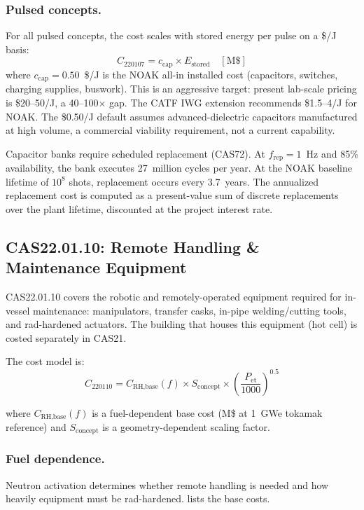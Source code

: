 \documentclass{article}
\begin{document}
\subsubsection{Pulsed concepts.}
For all pulsed concepts, the cost scales with stored energy per
pulse on a \$/J basis:
\begin{equation}
  C_{220107} = c_{\text{cap}} \times E_{\text{stored}} \quad [\text{M\$}]
\end{equation}
where $c_{\text{cap}} = 0.50$~\$/J is the NOAK all-in installed cost
(capacitors, switches, charging supplies, buswork).  This is an
aggressive target: present lab-scale pricing is \$20--50/J, a 40--100$\times$
gap.  The CATF IWG extension \citep{woodruff2026b} recommends
\$1.5--4/J for NOAK.  The \$0.50/J default assumes advanced-dielectric
capacitors manufactured at high volume, a commercial viability
requirement, not a current capability.

Capacitor banks require scheduled replacement (CAS72).  At $f_{\text{rep}}
= 1$~Hz and 85\% availability, the bank executes 27~million cycles per
year.  At the NOAK baseline lifetime of $10^8$ shots, replacement occurs
every 3.7~years.  The annualized replacement cost is computed as a
present-value sum of discrete replacements over the plant lifetime,
discounted at the project interest rate.

\subsection{CAS22.01.10: Remote Handling \& Maintenance Equipment}
\label{sec:cas2210}

CAS22.01.10 covers the robotic and remotely-operated equipment required
for in-vessel maintenance: manipulators, transfer casks, in-pipe
welding/cutting tools, and rad-hardened actuators. The building that
houses this equipment (hot cell) is costed separately in CAS21.

The cost model is:
\begin{equation}
\label{eq:cas2210}
C_{220110} = C_{\text{RH,base}}(f) \times S_{\text{concept}}
             \times \left(\frac{P_{\text{et}}}{1000}\right)^{0.5}
\end{equation}

\noindent where $C_{\text{RH,base}}(f)$ is a fuel-dependent base cost
(M\$ at 1~GWe tokamak reference) and $S_{\text{concept}}$ is a
geometry-dependent scaling factor.

\subsubsection{Fuel dependence.}
Neutron activation determines whether remote handling is needed and how
heavily equipment must be rad-hardened.
 lists the base costs.
\end{document}
